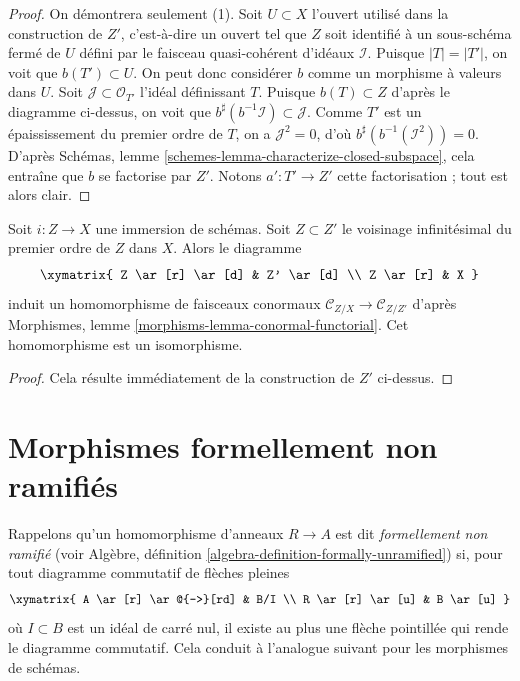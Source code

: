 \begin{proof}
On démontrera seulement (1).
Soit $U \subset X$ l'ouvert utilisé dans la construction de $Z'$, c'est-à-dire un
ouvert tel que $Z$ soit identifié à un sous-schéma fermé de $U$ défini par
le faisceau quasi-cohérent d'idéaux $\mathcal{I}$.
Puisque $|T| = |T'|$, on voit que $b(T') \subset U$. On peut donc
considérer $b$ comme un morphisme à valeurs dans $U$. Soit $\mathcal{J} \subset \mathcal{O}_{T'}$
l'idéal définissant $T$. Puisque $b(T) \subset Z$ d'après le diagramme ci-dessus,
on voit que $b^\sharp(b^{-1}\mathcal{I}) \subset \mathcal{J}$. Comme
$T'$ est un épaississement du premier ordre de $T$, on a $\mathcal{J}^2 = 0$,
d'où $b^\sharp(b^{-1}(\mathcal{I}^2)) = 0$. D'après
Schémas, lemme \ref{schemes-lemma-characterize-closed-subspace},
cela entraîne que $b$ se factorise par $Z'$. Notons $a' : T' \to Z'$
cette factorisation ; tout est alors clair.
\end{proof}

\begin{lemma}
\label{lemma-infinitesimal-neighbourhood-conormal}
Soit $i : Z \to X$ une immersion de schémas. Soit $Z \subset Z'$
le voisinage infinitésimal du premier ordre de $Z$ dans $X$.
Alors le diagramme
$$
\xymatrix{
Z \ar[r] \ar[d] & Z' \ar[d] \\
Z \ar[r] & X
}
$$
induit un homomorphisme de faisceaux conormaux $\mathcal{C}_{Z/X} \to \mathcal{C}_{Z/Z'}$ d'après
Morphismes, lemme \ref{morphisms-lemma-conormal-functorial}.
Cet homomorphisme est un isomorphisme.
\end{lemma}

\begin{proof}
Cela résulte immédiatement de la construction de $Z'$ ci-dessus.
\end{proof}

\section{Morphismes formellement non ramifiés}
\label{section-formally-unramified}

\noindent
Rappelons qu'un homomorphisme d'anneaux $R \to A$ est dit {\it formellement non ramifié}
(voir Algèbre, définition \ref{algebra-definition-formally-unramified})
si, pour tout diagramme commutatif de flèches pleines
$$
\xymatrix{
A \ar[r] \ar@{-->}[rd] & B/I \\
R \ar[r] \ar[u] & B \ar[u]
}
$$
où $I \subset B$ est un idéal de carré nul, il existe au plus une flèche
pointillée qui rende le diagramme commutatif. Cela conduit
à l'analogue suivant pour les morphismes de schémas.

